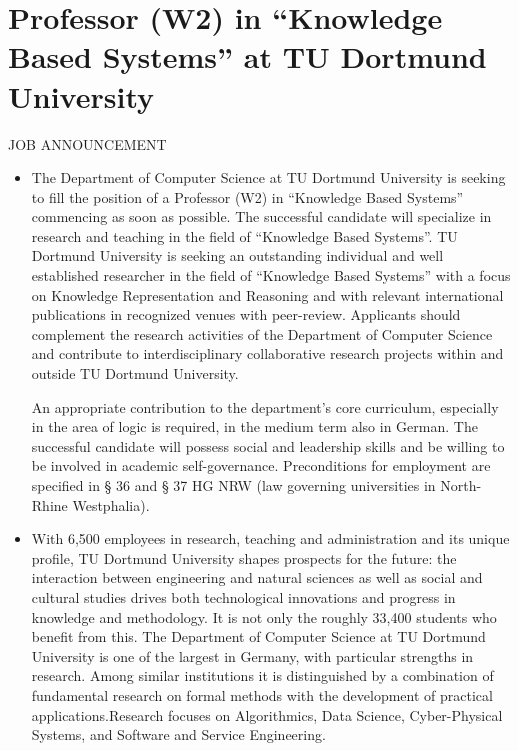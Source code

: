 \documentclass[prodmode,acmtecs]{acmsmall} %
\begin{document}
\begin{itemize}
\end{itemize}\section{Professor (W2) in “Knowledge Based Systems” at TU Dortmund University}\label{ProfessorW2inKnowledgeBasedSystemsatTUDortmundUniversity}JOB ANNOUNCEMENT 

\begin{itemize}\item  The Department of Computer Science at TU Dortmund University is seeking to fill the position of a Professor (W2) in “Knowledge Based Systems” commencing as soon as possible. The successful candidate will specialize in research and teaching in the field of “Knowledge Based Systems”. TU Dortmund University is seeking an outstanding individual and well established researcher in the field of “Knowledge Based Systems” with a focus on Knowledge Representation and Reasoning and with relevant international publications in recognized venues with peer-review. Applicants should complement the research activities of the Department of Computer Science and contribute to interdisciplinary collaborative research projects within and outside TU Dortmund University. 
 
  An appropriate contribution to the department’s core curriculum, especially in the area of logic is required, in the medium term also in German. The successful candidate will possess social and leadership skills and be willing to be involved in academic self-governance. Preconditions for employment are specified in § 36 and § 37 HG NRW (law governing universities in North-Rhine Westphalia). 
 
\item  With 6,500 employees in research, teaching and administration and its unique profile, TU Dortmund University shapes prospects for the future: the interaction between engineering and natural sciences as well as social and cultural studies drives both technological innovations and progress in knowledge and methodology. It is not only the roughly 33,400 students who benefit from this. The Department of Computer Science at TU Dortmund University is one of the largest in Germany, with particular strengths in research. Among similar institutions it is distinguished by a combination of fundamental research on formal methods with the development of practical applications.Research focuses on Algorithmics, Data Science, Cyber-Physical Systems, and Software and Service Engineering. 
 

\end{itemize}
\end{document}

